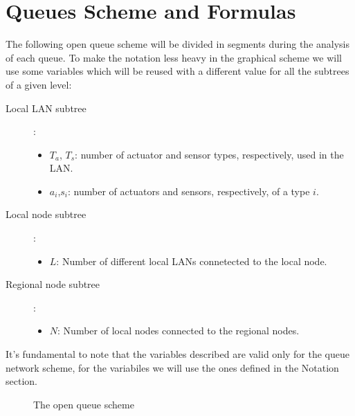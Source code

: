 \documentclass[11pt]{article}
\begin{document}
\section{Queues Scheme and Formulas}
The following open queue scheme will be divided in segments during the analysis of each queue.
To make the notation less heavy in the graphical scheme we will use some variables which will be reused with a different value for all the subtrees of a given level:
\begin{description}
	\item[Local LAN subtree]:
	\begin{itemize}
		\item $T_a$, $T_s$: number of actuator and sensor types, respectively, used in the LAN.
		\item $a_i$,$s_i$: number of actuators and sensors, respectively, of a type $i$.
	\end{itemize}
	\item[Local node subtree]:
	\begin{itemize}
		\item $L$: Number of different local LANs connetected to the local node.
	\end{itemize}
	\item[Regional node subtree]:
	\begin{itemize}
	 \item $N$: Number of local nodes connected to the regional nodes.
	\end{itemize}
\end{description}
It's fundamental to note that the variables described are valid only for the queue network scheme, for the variabiles we will use the ones defined in the Notation section.\\
\begin{figure}[H]
	\vspace*{-0.5cm}
	\hspace*{-3.5cm}
	\centering
	\frame{}
	\caption{The open queue scheme}
\end{figure}
\end{document}
